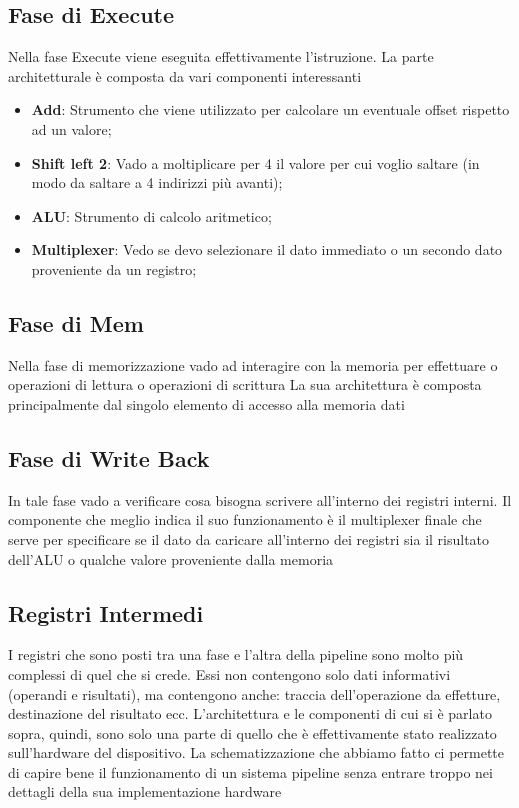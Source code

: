 \subsection{Fase di Execute}
Nella fase Execute viene eseguita effettivamente l'istruzione. La parte architetturale è composta da vari componenti interessanti
\begin{itemize}
    \item \textbf{Add}: Strumento che viene utilizzato per calcolare un eventuale offset rispetto ad un valore;
    \item \textbf{Shift left 2}: Vado a moltiplicare per 4 il valore per cui voglio saltare (in modo da saltare a 4 indirizzi più avanti);
    \item \textbf{ALU}: Strumento di calcolo aritmetico;
    \item \textbf{Multiplexer}: Vedo se devo selezionare il dato immediato o un secondo dato proveniente da un registro;
\end{itemize}

\subsection{Fase di Mem}
Nella fase di memorizzazione vado ad interagire con la memoria per effettuare o operazioni di lettura o operazioni di scrittura
La sua architettura è composta principalmente dal singolo elemento di accesso alla memoria dati

\subsection{Fase di Write Back}
In tale fase vado a verificare cosa bisogna scrivere all'interno dei registri interni. Il componente che meglio indica il suo funzionamento è il multiplexer finale che serve per specificare se il dato da caricare all'interno dei registri sia il risultato dell'ALU o qualche valore proveniente dalla memoria

\subsection{Registri Intermedi}
I registri che sono posti tra una fase e l'altra della pipeline sono molto più complessi di quel che si crede. Essi non contengono solo dati informativi (operandi e risultati), ma contengono anche: traccia dell'operazione da effetture, destinazione del risultato ecc. 
L'architettura e le componenti di cui si è parlato sopra, quindi, sono solo una parte di quello che è effettivamente stato realizzato sull'hardware del dispositivo.
La schematizzazione che abbiamo fatto ci permette di capire bene il funzionamento di un sistema pipeline senza entrare troppo nei dettagli della sua implementazione hardware

